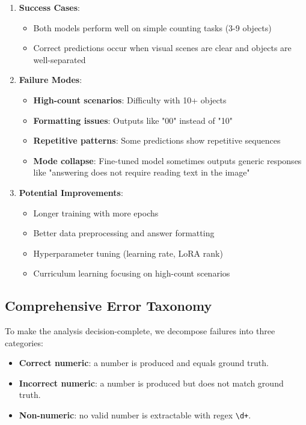 \documentclass[conference]{IEEEtran}
\begin{document}
\begin{enumerate}
    \item \textbf{Success Cases}:
    \begin{itemize}
        \item Both models perform well on simple counting tasks (3-9 objects)
        \item Correct predictions occur when visual scenes are clear and objects are well-separated
    \end{itemize}
    
    \item \textbf{Failure Modes}:
    \begin{itemize}
        \item \textbf{High-count scenarios}: Difficulty with 10+ objects
        \item \textbf{Formatting issues}: Outputs like "00" instead of "10"
        \item \textbf{Repetitive patterns}: Some predictions show repetitive sequences
        \item \textbf{Mode collapse}: Fine-tuned model sometimes outputs generic responses like "answering does not require reading text in the image"
    \end{itemize}
    
    \item \textbf{Potential Improvements}:
    \begin{itemize}
        \item Longer training with more epochs
        \item Better data preprocessing and answer formatting
        \item Hyperparameter tuning (learning rate, LoRA rank)
        \item Curriculum learning focusing on high-count scenarios
    \end{itemize}
\end{enumerate}

\subsection{Comprehensive Error Taxonomy}

To make the analysis decision-complete, we decompose failures into three categories:
\begin{itemize}
    \item \textbf{Correct numeric}: a number is produced and equals ground truth.
    \item \textbf{Incorrect numeric}: a number is produced but does not match ground truth.
    \item \textbf{Non-numeric}: no valid number is extractable with regex \texttt{\textbackslash d+}.
\end{itemize}
\end{document}
